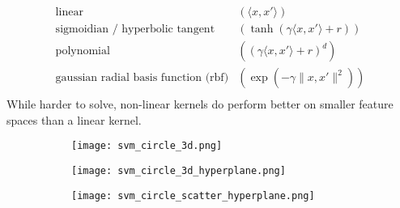 \[
\begin{array}{ll}
    \text{linear} & (\langle x,x'\rangle)\\\nonumber
    \text{sigmoidian / hyperbolic tangent} & (\tanh{(\gamma\langle x,x'\rangle+r)})\\\nonumber
    \text{polynomial} & ((\gamma\langle x,x'\rangle+r)^d)\\\nonumber
    \text{gaussian radial basis function (rbf)} & (\exp{(-\gamma\lVert x,x'\rVert^2)})\\\nonumber
\end{array}
\]
While harder to solve, non-linear kernels do perform better on smaller feature spaces than a linear kernel.
\begin{figure}[ht] %
    \centering
    \begin{subfigure}{.33\textwidth}
        \centering
        \texttt{[image: svm\_circle\_3d.png]}
        \caption{}
        \label{fig:svm_nonlineardata_3dprojection} 
    \end{subfigure}%
    \begin{subfigure}{.33\textwidth}
        \centering
        \texttt{[image: svm\_circle\_3d\_hyperplane.png]}
        \caption{}
        \label{fig:svm_nonlineardata_3dprojection_hyperplane}
    \end{subfigure}%
    \begin{subfigure}{.33\textwidth}
        \centering
        \texttt{[image: svm\_circle\_scatter\_hyperplane.png]}
        \caption{}
        \label{fig:svm_nonlineardata_hyperplane}
    \end{subfigure} 
    \label{fig:svm_nonlineardata_whole}
\end{figure}

